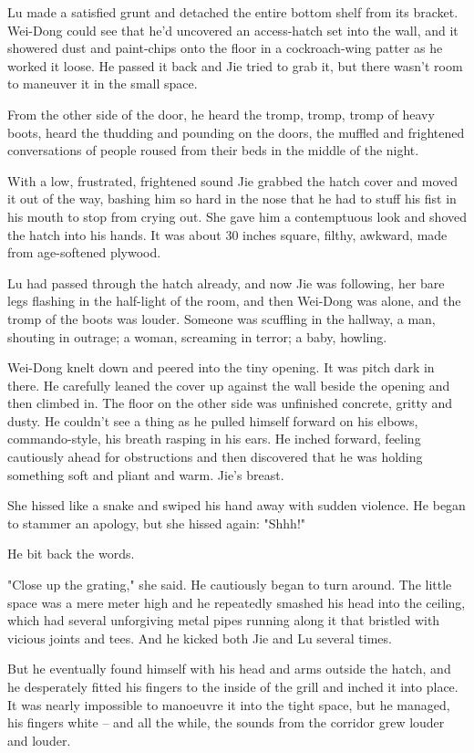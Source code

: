Lu made a satisfied grunt and detached the entire bottom shelf from
its bracket. Wei-Dong could see that he'd uncovered an access-hatch
set into the wall, and it showered dust and paint-chips onto the
floor in a cockroach-wing patter as he worked it loose. He passed
it back and Jie tried to grab it, but there wasn't room to maneuver
it in the small space.

From the other side of the door, he heard the tromp, tromp, tromp
of heavy boots, heard the thudding and pounding on the doors, the
muffled and frightened conversations of people roused from their
beds in the middle of the night.

With a low, frustrated, frightened sound Jie grabbed the hatch
cover and moved it out of the way, bashing him so hard in the nose
that he had to stuff his fist in his mouth to stop from crying out.
She gave him a contemptuous look and shoved the hatch into his
hands. It was about 30 inches square, filthy, awkward, made from
age-softened plywood.

Lu had passed through the hatch already, and now Jie was following,
her bare legs flashing in the half-light of the room, and then
Wei-Dong was alone, and the tromp of the boots was louder. Someone
was scuffling in the hallway, a man, shouting in outrage; a woman,
screaming in terror; a baby, howling.

Wei-Dong knelt down and peered into the tiny opening. It was pitch
dark in there. He carefully leaned the cover up against the wall
beside the opening and then climbed in. The floor on the other side
was unfinished concrete, gritty and dusty. He couldn't see a thing
as he pulled himself forward on his elbows, commando-style, his
breath rasping in his ears. He inched forward, feeling cautiously
ahead for obstructions and then discovered that he was holding
something soft and pliant and warm. Jie's breast.

She hissed like a snake and swiped his hand away with sudden
violence. He began to stammer an apology, but she hissed again:
"Shhh!"

He bit back the words.

"Close up the grating," she said. He cautiously began to turn
around. The little space was a mere meter high and he repeatedly
smashed his head into the ceiling, which had several unforgiving
metal pipes running along it that bristled with vicious joints and
tees. And he kicked both Jie and Lu several times.

But he eventually found himself with his head and arms outside the
hatch, and he desperately fitted his fingers to the inside of the
grill and inched it into place. It was nearly impossible to
manoeuvre it into the tight space, but he managed, his fingers
white -- and all the while, the sounds from the corridor grew
louder and louder.

